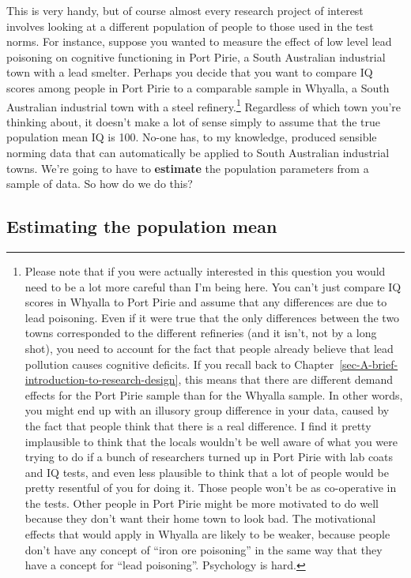 \documentclass[
  a4paper,
]{book}
\begin{document}
This is very handy, but of course almost every research project of
interest involves looking at a different population of people to those
used in the test norms. For instance, suppose you wanted to measure the
effect of low level lead poisoning on cognitive functioning in Port
Pirie, a South Australian industrial town with a lead smelter. Perhaps
you decide that you want to compare IQ scores among people in Port Pirie
to a comparable sample in Whyalla, a South Australian industrial town
with a steel refinery.\footnote{Please note that if you were actually
  interested in this question you would need to be a lot more careful
  than I'm being here. You can't just compare IQ scores in Whyalla to
  Port Pirie and assume that any differences are due to lead poisoning.
  Even if it were true that the only differences between the two towns
  corresponded to the different refineries (and it isn't, not by a long
  shot), you need to account for the fact that people already believe
  that lead pollution causes cognitive deficits. If you recall back to
  Chapter~\ref{sec-A-brief-introduction-to-research-design}, this means
  that there are different demand effects for the Port Pirie sample than
  for the Whyalla sample. In other words, you might end up with an
  illusory group difference in your data, caused by the fact that people
  think that there is a real difference. I find it pretty implausible to
  think that the locals wouldn't be well aware of what you were trying
  to do if a bunch of researchers turned up in Port Pirie with lab coats
  and IQ tests, and even less plausible to think that a lot of people
  would be pretty resentful of you for doing it. Those people won't be
  as co-operative in the tests. Other people in Port Pirie might be more
  motivated to do well because they don't want their home town to look
  bad. The motivational effects that would apply in Whyalla are likely
  to be weaker, because people don't have any concept of ``iron ore
  poisoning'' in the same way that they have a concept for ``lead
  poisoning''. Psychology is hard.} Regardless of which town you're
thinking about, it doesn't make a lot of sense simply to assume that the
true population mean IQ is 100. No-one has, to my knowledge, produced
sensible norming data that can automatically be applied to South
Australian industrial towns. We're going to have to \textbf{estimate}
the population parameters from a sample of data. So how do we do this?

\hypertarget{estimating-the-population-mean}{%
\subsection{Estimating the population
mean}\label{estimating-the-population-mean}}
\end{document}
